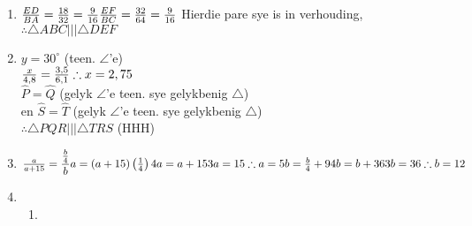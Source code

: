 \begin{eocsolutions}{}
{\begin{enumerate}[itemsep=5pt, label=\textbf{\arabic*}. ]
\begin{enumerate}[noitemsep, label=\textbf{(\alph*)} ]
\item $x=\sqrt{13^2+5^2} = \sqrt{139-25} =\sqrt{144} =12$ cm%

\item $x=\sqrt{2^2+7^2} = \sqrt{4+49} =\sqrt{53} =7,28$ cm%

\item $AC=\sqrt{25^2-7^2} = 576\\
\therefore AC=24\\
x^2 = 32^2+24^2\\
\therefore x=40$ mm%
	  \end{enumerate}
\item 
$\frac{ED}{BA} = \frac{18}{32} = \frac{9}{16}\\
\frac{EF}{BC} = \frac{32}{64} = \frac{9}{16}\\$
Hierdie pare sye is in verhouding, $\therefore \triangle ABC ||| \triangle DEF$
\item 
$y=30^{\circ}$ (teen. $\angle$'e)\\
$\frac{x}{4,8} = \frac{3,5}{6,1} \\
\therefore x = 2,75$\\
$\hat{P} = \hat{Q}$ (gelyk $\angle$'e teen. sye gelykbenig $\triangle$)\\
en $\hat{S} = \hat{T}$ (gelyk $\angle$'e teen. sye gelykbenig $\triangle$)\\
$\therefore \triangle PQR ||| \triangle TRS$ (HHH)
\item 
$\frac{a}{a+15} = \dfrac{\frac{b}{4}}{b}\\
a = (a+15) \left(\frac{1}{4}\right) \\
4a = a+15\\
3a=15\\
\therefore a=5\\
\\
b=\frac{b}{4} +9\\
4b=b+36\\
3b=36\\
\therefore b=12$
\item %
 \begin{enumerate}[noitemsep, label=\textbf{(\alph*)} ]
      \item 


\end{enumerate}
\end{enumerate}}
\end{eocsolutions}
